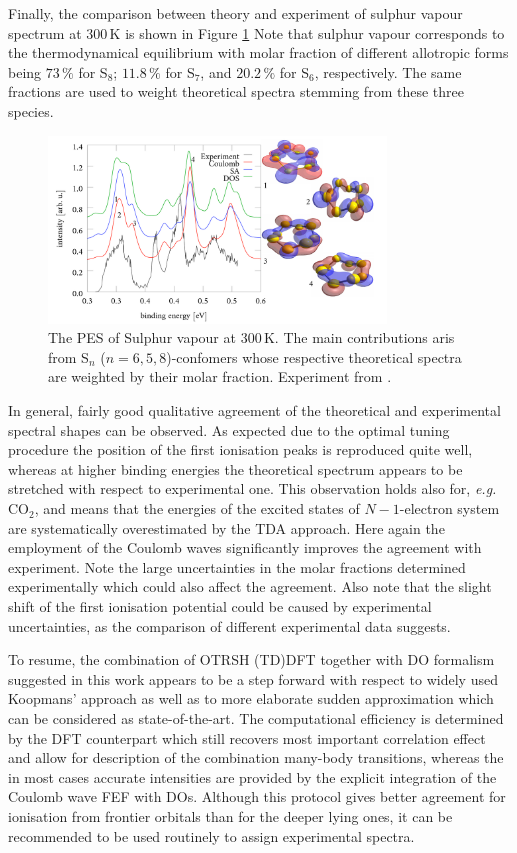 Finally, the comparison between theory and experiment \cite{S_100} of sulphur vapour spectrum at $300$\,K is shown in Figure \ref{fig:S8PES}
Note that sulphur vapour corresponds to the thermodynamical equilibrium with molar fraction of different allotropic forms being $73\,\%$ for S$_8$; $11.8\,\%$ for S$_7$, and $20.2\,\%$ for S$_6$, respectively\cite{ThermoSulphur}. 
The same fractions are used to weight theoretical spectra stemming from these three species.
\begin{figure}
   \includegraphics[width=0.8\textwidth]{Figures/Sulphur/S8_vPES}
   \caption{The PES of Sulphur vapour at $300\,$K. The main contributions aris from S$_n$ ($n=6,5,8$)-confomers whose 
   respective theoretical spectra are weighted by their molar fraction.
   Experiment from \cite{S_100}.}
   \label{fig:S8PES}
\end{figure}
In general, fairly good qualitative agreement of the theoretical and experimental spectral shapes can be observed.
As expected due to the optimal tuning procedure the position of the first ionisation peaks is reproduced quite well, whereas at higher binding energies the theoretical spectrum appears to be stretched with respect to experimental one.
This observation holds also for, \textit{e.g.} CO$_2$, and means that the energies of the excited states of $N-1$-electron system are systematically overestimated by the TDA approach.
Here again the employment of the Coulomb waves significantly improves the agreement with experiment.
Note the large uncertainties in the molar fractions determined experimentally which could also affect the agreement.
Also note that the slight shift of the first ionisation potential could be caused by experimental uncertainties, as the comparison of different experimental data suggests.

To resume, the combination of OTRSH (TD)DFT together with DO formalism suggested in this work appears to be a step forward with respect to widely used Koopmans' approach as well as to more elaborate sudden approximation which can be considered as state-of-the-art.
The computational efficiency is determined by the DFT counterpart which still recovers most important correlation effect and allow for description of the combination many-body transitions, whereas the in most cases accurate intensities are provided by the explicit integration of the Coulomb wave FEF with DOs.
Although this protocol gives better agreement for ionisation from frontier orbitals than for the deeper lying ones, it can be recommended to be used routinely to assign experimental spectra.

